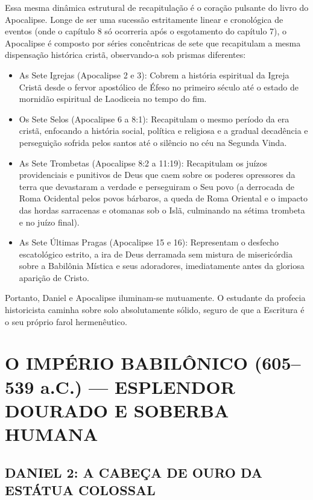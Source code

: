 \documentclass[11pt,a4paper,openany]{book}
\begin{document}
Essa mesma dinâmica estrutural de recapitulação é o coração pulsante do livro do Apocalipse. Longe de ser uma sucessão estritamente linear e cronológica de eventos (onde o capítulo 8 só ocorreria após o esgotamento do capítulo 7), o Apocalipse é composto por séries concêntricas de sete que recapitulam a mesma dispensação histórica cristã, observando-a sob prismas diferentes:
\begin{itemize}
  \item As Sete Igrejas (Apocalipse 2 e 3): Cobrem a história espiritual da Igreja Cristã desde o fervor apostólico de Éfeso no primeiro século até o estado de mornidão espiritual de Laodiceia no tempo do fim.
  \item Os Sete Selos (Apocalipse 6 a 8:1): Recapitulam o mesmo período da era cristã, enfocando a história social, política e religiosa e a gradual decadência e perseguição sofrida pelos santos até o silêncio no céu na Segunda Vinda.
  \item As Sete Trombetas (Apocalipse 8:2 a 11:19): Recapitulam os juízos providenciais e punitivos de Deus que caem sobre os poderes opressores da terra que devastaram a verdade e perseguiram o Seu povo (a derrocada de Roma Ocidental pelos povos bárbaros, a queda de Roma Oriental e o impacto das hordas sarracenas e otomanas sob o Islã, culminando na sétima trombeta e no juízo final).
  \item As Sete Últimas Pragas (Apocalipse 15 e 16): Representam o desfecho escatológico estrito, a ira de Deus derramada sem mistura de misericórdia sobre a Babilônia Mística e seus adoradores, imediatamente antes da gloriosa aparição de Cristo.
\end{itemize}


Portanto, Daniel e Apocalipse iluminam-se mutuamente. O estudante da profecia historicista caminha sobre solo absolutamente sólido, seguro de que a Escritura é o seu próprio farol hermenêutico.



\section{O IMPÉRIO BABILÔNICO (605–539 a.C.) — ESPLENDOR DOURADO E SOBERBA HUMANA}



\subsection{DANIEL 2: A CABEÇA DE OURO DA ESTÁTUA COLOSSAL}
\end{document}

